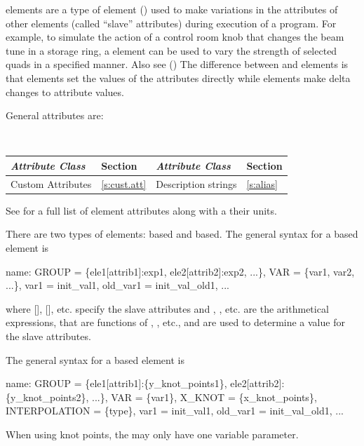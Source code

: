  elements are a type of  element
() used to make variations in the attributes of
other elements (called ``slave'' attributes) during execution of a
program. For example, to simulate the action of a control room knob
that changes the beam tune in a storage ring, a  element can
be used to vary the strength of selected quads in a specified
manner. Also see  () The difference
between  and  elements is that 
elements set the values of the attributes directly while 
elements make delta changes to attribute values.

General  attributes are:
\begin{center}
\tt
\begin{tabular}{llll} \toprule
  {\sl Attribute Class}      & Section           & {\sl Attribute Class}      & Section         \\ \midrule
  Custom Attributes          & \ref{s:cust.att}  & Description strings        & \ref{s:alias}   \\ 
  \bottomrule
\end{tabular}
\end{center}
\toffset
See  for a full list of element attributes along with a their units.

There are two types of  elements:  based and  based.
The general syntax for a  based  element is
\begin{example}
  name: GROUP = \{ele1[attrib1]:exp1, ele2[attrib2]:exp2, ...\}, 
              VAR = \{var1, var2, ...\}, var1 = init_val1, old_var1 = init_val_old1, ...
\end{example}
where [], [], etc. specify the slave attributes and
, , etc. are the arithmetical expressions, that are functions of ,
, etc., and are used to determine a value for the slave attributes.

The general syntax for a  based   element is
\begin{example}
  name: GROUP = \{ele1[attrib1]:\{y_knot_points1\}, ele2[attrib2]:\{y_knot_points2\}, ...\}, 
              VAR = \{var1\}, X_KNOT = \{x_knot_points\}, INTERPOLATION = \{type\}, 
              var1 = init_val1, old_var1 = init_val_old1, ...
\end{example}
When using knot points, the  may only have one variable parameter.

